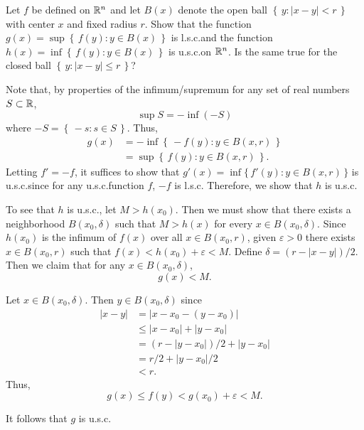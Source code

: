 \begin{problem}
  Let \(f\) be defined on \(\mathbb{R}^n\) and let \(B(x)\) denote the open ball
  \(\left\{\,y:|x-y|<r\,\right\}\) with center \(x\) and fixed radius
  \(r\). Show that the function
  \(g(x)=\sup\left\{\,f(y):y\in B(x)\,\right\}\) is l.s.c.\@ and the
  function \(h(x)=\inf\left\{\,f(y):y\in B(x)\,\right\}\) is u.s.c.\@ on
  \(\mathbb{R}^n\). Is the same true for the closed ball
  \(\left\{\,y:|x-y|\leq r\,\right\}\)?
\end{problem}
\begin{solution}
  Note that, by properties of the infimum/supremum for any set of real
  numbers \(S\subset\mathbb{R}\),
  \[
    \sup S=-\inf (-S)
  \]
  where \(-S=\left\{\,-s:s\in S\,\right\}\). Thus,
  \begin{align*}
    g(x)
    &=-\inf\left\{\,-f(y):y\in B(x,r)\,\right\}\\
    &=\sup\left\{\,f(y):y\in B(x,r)\, \right\}.
  \end{align*}
  Letting \(f'=-f\), it suffices to show that
  \(g'(x)=\inf\{\,f'(y):y\in B(x,r)\,\}\) is u.s.c.\@ since for any
  u.s.c.\@ function \(f\), \(-f\) is l.s.c. Therefore, we show that \(h\)
  is u.s.c.

  To see that \(h\) is u.s.c., let \(M>h(x_0)\). Then we must show that
  there exists a neighborhood \(B(x_0,\delta)\) such that \(M>h(x)\) for
  every \(x\in B(x_0,\delta)\). Since \(h(x_0)\) is the infimum of \(f(x)\)
  over all \(x\in B(x_0,r)\), given \(\varepsilon>0\) there exists
  \(x\in B(x_0,r)\) such that \(f(x)<h(x_0)+\varepsilon<M\). Define
  \(\delta=(r-|x-y|)/2\). Then we claim that for any
  \(x\in B(x_0,\delta)\),
  \[
    g(x)<M.
  \]
  \begin{subproof}
    Let \(x\in B(x_0,\delta)\). Then \(y\in B(x_0,\delta)\) since
    \begin{align*}
      |x-y|&=|x-x_0-(y-x_0)|\\
           &\leq |x-x_0|+|y-x_0|\\
           &=(r-|y-x_0|)/2+|y-x_0|\\
           &=r/2+|y-x_0|/2\\
           &<r.
    \end{align*}
    Thus,
    \[
      g(x)\leq f(y)<g(x_0)+\varepsilon<M.
    \]
  \end{subproof}
  It follows that \(g\) is u.s.c.
\end{solution}

